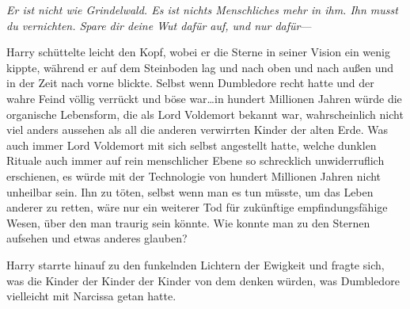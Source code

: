 \emph{Er ist nicht wie Grindelwald. Es ist nichts Menschliches mehr in ihm. Ihn musst du vernichten. Spare dir deine Wut dafür auf, und nur dafür}—

Harry schüttelte leicht den Kopf, wobei er die Sterne in seiner Vision ein wenig kippte, während er auf dem Steinboden lag und nach oben und nach außen und in der Zeit nach vorne blickte. Selbst wenn Dumbledore recht hatte und der wahre Feind völlig verrückt und böse war…in hundert Millionen Jahren würde die organische Lebensform, die als Lord Voldemort bekannt war, wahrscheinlich nicht viel anders aussehen als all die anderen verwirrten Kinder der alten Erde. Was auch immer Lord Voldemort mit sich selbst angestellt hatte, welche dunklen Rituale auch immer auf rein menschlicher Ebene so schrecklich unwiderruflich erschienen, es würde mit der Technologie von hundert Millionen Jahren nicht unheilbar sein. Ihn zu töten, selbst wenn man es tun müsste, um das Leben anderer zu retten, wäre nur ein weiterer Tod für zukünftige empfindungsfähige Wesen, über den man traurig sein könnte. Wie konnte man zu den Sternen aufsehen und etwas anderes glauben?

Harry starrte hinauf zu den funkelnden Lichtern der Ewigkeit und fragte sich, was die Kinder der Kinder der Kinder von dem denken würden, was Dumbledore vielleicht mit Narcissa getan hatte.

